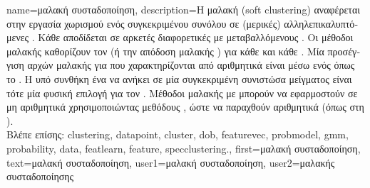 {name={\foreignlanguage{greek}{μαλακή συσταδοποίηση}}, 
	description={\foreignlanguage{greek}{Η μαλακή}  
		(soft clustering) \foreignlanguage{greek}{αναφέρεται στην εργασία χωρισμού ενός συγκεκριμένου συνόλου} 
		 \foreignlanguage{greek}{σε (μερικές) αλληλεπικαλυπτόμενες} . 
		\foreignlanguage{greek}{Κάθε}  \foreignlanguage{greek}{αποδίδεται σε αρκετές διαφορετικές} 
		 \foreignlanguage{greek}{με μεταβαλλόμενους} . \foreignlanguage{greek}{Οι 
		μέθοδοι μαλακής}  \foreignlanguage{greek}{καθορίζουν τον}
		 (\foreignlanguage{greek}{ή την απόδοση μαλακής} ) \foreignlanguage{greek}{για 
		κάθε}  \foreignlanguage{greek}{και κάθε} .
		\foreignlanguage{greek}{Μία προσέγγιση αρχών μαλακής}  \foreignlanguage{greek}{για} 
		 \foreignlanguage{greek}{που χαρακτηρίζονται από αριθμητικά}  
		\foreignlanguage{greek}{είναι μέσω ενός}  \foreignlanguage{greek}{όπως το} . 
		\foreignlanguage{greek}{Η}  \foreignlanguage{greek}{υπό συνθήκη ένα}  
		\foreignlanguage{greek}{να ανήκει σε μία συγκεκριμένη συνιστώσα μεί\-γματος είναι τότε μία φυσική επιλογή για τον} 
		. \foreignlanguage{greek}{Μέθοδοι μαλακής}   \foreignlanguage{greek}{με} 
		 \foreignlanguage{greek}{μπορούν να εφαρμοστούν σε μη αριθμητικά}  
		\foreignlanguage{greek}{χρησιμοποιώντας μεθόδους} , \foreignlanguage{greek}{ώστε να παραχθούν 
		αριθμητικά}  (\foreignlanguage{greek}{όπως στη} ).
		\\
		\foreignlanguage{greek}{Βλέπε επίσης:} \gls{clustering}, \gls{datapoint}, \gls{cluster}, \gls{dob}, \gls{featurevec}, \gls{probmodel}, 
		\gls{gmm}, \gls{probability}, \gls{data}, \gls{featlearn}, \gls{feature}, \gls{specclustering}.},
	first={\foreignlanguage{greek}{μαλακή συσταδοποίηση}},
	text={\foreignlanguage{greek}{μαλακή συσταδοποίηση}},
	user1={\foreignlanguage{greek}{μαλακή συσταδοποίηση}}, %
	user2={\foreignlanguage{greek}{μαλακής συσταδοποίησης}} %
}

